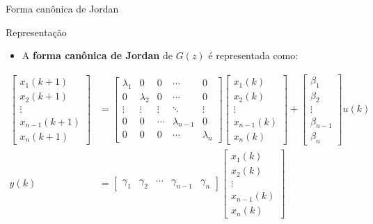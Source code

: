 \begin{frame}{Forma canônica de Jordan}
\begin{block}{Representação}
\begin{itemize}
    \item A \textbf{forma canônica de Jordan} de $G(z)$ é representada como:
\end{itemize}

\begin{align*}
    \begin{bmatrix} x_1(k+1) \\ x_2(k+1) \\ \vdots \\  x_{n-1}(k+1) \\ x_n(k+1) \end{bmatrix}
    &=
    \begin{bmatrix}
    \lambda_1 & 0 & 0 & \cdots & 0 \\
    0 & \lambda_2 & 0 & \cdots & 0 \\
     \vdots & \vdots & \vdots & \ddots & \vdots \\
    0 & 0 & \cdots & \lambda_{n-1} & 0 \\
    0 & 0 & 0 & \cdots & \lambda_n
    \end{bmatrix}
    \begin{bmatrix} x_1(k) \\ x_2(k) \\ \vdots \\  x_{n-1}(k) \\ x_n(k) \end{bmatrix}
    +
    \begin{bmatrix}
    \beta_1 \\ \beta_2 \\ \vdots \\ \beta_{n-1} \\ \beta_n
    \end{bmatrix}
    u(k) \\
    y(k)
    &=
    \begin{bmatrix}
    \gamma_1 & \gamma_2 & \cdots & \gamma_{n-1} & \gamma_n
    \end{bmatrix}
    \begin{bmatrix}
    x_1(k) \\ x_2(k) \\ \vdots \\  x_{n-1}(k) \\ x_n(k)
    \end{bmatrix}
\end{align*}
\end{block}
\end{frame}

